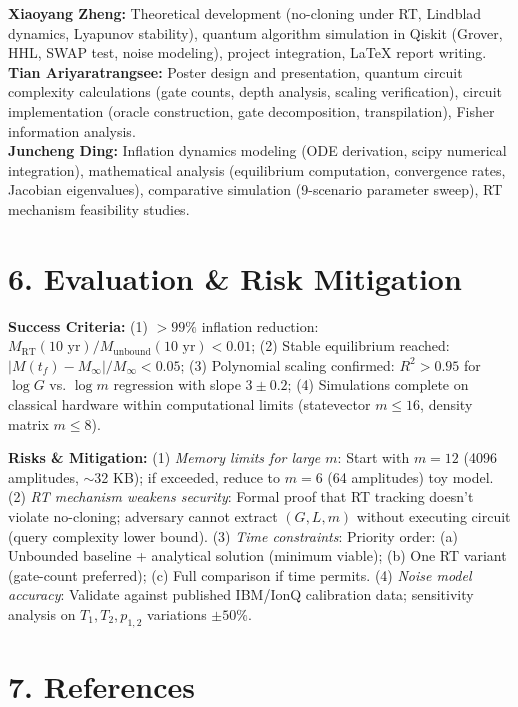 \documentclass[a4paper,10pt,twoside]{article}
\begin{document}
\textbf{Xiaoyang Zheng:} Theoretical development (no-cloning under RT, Lindblad dynamics, Lyapunov stability), quantum algorithm simulation in Qiskit (Grover, HHL, SWAP test, noise modeling), project integration, LaTeX report writing. \\
\textbf{Tian Ariyaratrangsee:} Poster design and presentation, quantum circuit complexity calculations (gate counts, depth analysis, scaling verification), circuit implementation (oracle construction, gate decomposition, transpilation), Fisher information analysis. \\
\textbf{Juncheng Ding:} Inflation dynamics modeling (ODE derivation, scipy numerical integration), mathematical analysis (equilibrium computation, convergence rates, Jacobian eigenvalues), comparative simulation (9-scenario parameter sweep), RT mechanism feasibility studies.

\vspace{-4pt}
\section*{6. Evaluation \& Risk Mitigation}
\vspace{-4pt}

\textbf{Success Criteria:} (1) $>99\%$ inflation reduction: $M_{\text{RT}}(10\text{ yr})/M_{\text{unbound}}(10\text{ yr}) < 0.01$; (2) Stable equilibrium reached: $|M(t_f) - M_{\infty}|/M_{\infty} < 0.05$; (3) Polynomial scaling confirmed: $R^2 > 0.95$ for $\log G$ vs. $\log m$ regression with slope $3 \pm 0.2$; (4) Simulations complete on classical hardware within computational limits (statevector $m \leq 16$, density matrix $m \leq 8$).

\textbf{Risks \& Mitigation:} (1) \textit{Memory limits for large $m$}: Start with $m=12$ (4096 amplitudes, $\sim$32 KB); if exceeded, reduce to $m=6$ (64 amplitudes) toy model. (2) \textit{RT mechanism weakens security}: Formal proof that RT tracking doesn't violate no-cloning; adversary cannot extract $(G,L,m)$ without executing circuit (query complexity lower bound). (3) \textit{Time constraints}: Priority order: (a) Unbounded baseline + analytical solution (minimum viable); (b) One RT variant (gate-count preferred); (c) Full comparison if time permits. (4) \textit{Noise model accuracy}: Validate against published IBM/IonQ calibration data; sensitivity analysis on $T_1, T_2, p_{1,2}$ variations $\pm 50\%$.

\vspace{-4pt}
\section*{7. References}
\vspace{-4pt}
\end{document}

